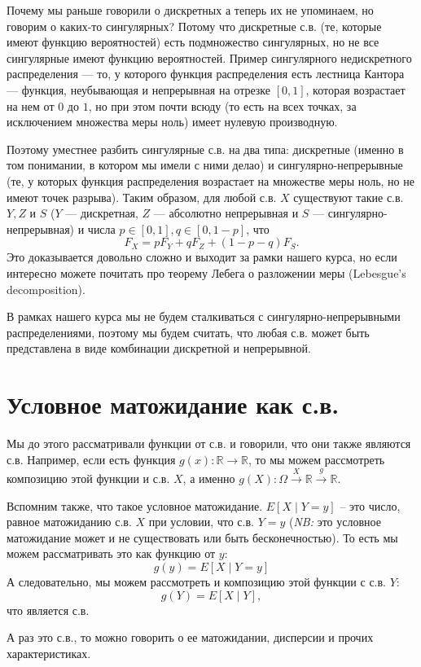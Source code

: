 \documentclass[12pt]{article}
\newcommand\R{\mathbb{R}}
\begin{document}
Почему мы раньше говорили о дискретных а теперь их не упоминаем, но говорим о каких-то сингулярных? Потому что дискретные с.в. (те, которые имеют функцию вероятностей) есть подмножество сингулярных, но не все сингулярные имеют функцию вероятностей. Пример сингулярного недискретного распределения --- то, у которого функция распределения есть лестница Кантора --- функция, неубывающая и непрерывная на отрезке $[0, 1]$, которая возрастает на нем от $0$ до $1$, но при этом почти всюду (то есть на всех точках, за исключением множества меры ноль) имеет нулевую производную.

Поэтому уместнее разбить сингулярные с.в. на два типа: дискретные (именно в том понимании, в котором мы имели с ними делао) и сингулярно-непрерывные (те, у которых функция распределения возрастает на множестве меры ноль, но не имеют точек разрыва). Таким образом, для любой с.в. $X$ существуют такие с.в. $Y, Z$ и $S$ ($Y$ --- дискретная, $Z$ --- абсолютно непрерывная и $S$ --- сингулярно-непрерывная) и числа $p \in [0, 1], q \in [0, 1 - p]$, что 
\[
  F_X = pF_Y + qF_Z + (1 - p - q)F_S.
\]
Это доказывается довольно сложно и выходит за рамки нашего курса, но если интересно можете почитать про теорему Лебега о разложении меры (Lebesgue's decomposition).

В рамках нашего курса мы не будем сталкиваться с сингулярно-непрерывными распределениями, поэтому мы будем считать, что любая с.в. может быть представлена в виде комбинации дискретной и непрерывной. 

\section{Условное матожидание как с.в.}

Мы до этого рассматривали функции от с.в. и говорили, что они также являются с.в. Например, если есть функция $g(x): \R \to \R$, то мы можем рассмотреть композицию этой функции и с.в. $X$, а именно $g(X): \Omega \overset{X}{\to} \R \overset{g}{\to} \R$. 

Вспомним также, что такое условное матожидание. $E[X \mid Y = y]$ -- это число, равное матожиданию с.в. $X$ при условии, что с.в. $Y = y$ (\emph{NB:} это условное матожидание может и не существовать или быть бесконечностью). То есть мы можем рассматривать это как функцию от $y$:
\[
  g(y) = E[X \mid Y = y]
\]
А следовательно, мы можем рассмотреть и композицию этой функции с с.в. $Y$:
\[
  g(Y) = E[X \mid Y],
\]
что является с.в.

А раз это с.в., то можно говорить о ее матожидании, дисперсии и прочих характеристиках.
\end{document}
